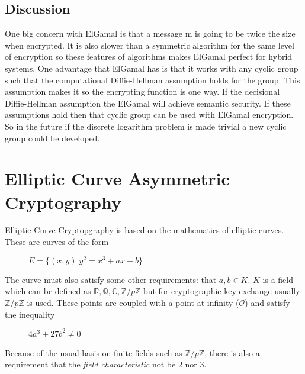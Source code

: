 \documentclass[conference]{IEEEtran}
\begin{document}
\subsection{Discussion}
One big concern with ElGamal is that a message m is going to be twice the size when encrypted. It is also slower than a symmetric algorithm for the same level of encryption so these features of algorithms makes ElGamal perfect for hybrid systems. \newline \indent
One advantage that ElGamal has is that it works with any cyclic group such that the computational Diffie-Hellman assumption holds for the group. This assumption makes it so the encrypting function is one way. If the decisional Diffie-Hellman assumption the ElGamal will achieve semantic security. If these assumptions hold then that cyclic group can be used with ElGamal encryption. So in the future if the discrete logarithm problem is made trivial a new cyclic group could be developed.


\section{Elliptic Curve Asymmetric Cryptography}
Elliptic Curve Cryptopgraphy is based on the mathematics of elliptic curves. These are curves of the form

\begin{figure}[h]
	\begin{center}
		$E = \{(x, y) | y^2 = x^3 + ax + b\}$
	\end{center}
\end{figure}

The curve must also satisfy some other requirements: that $a, b \in K$. $K$ is a field which can be defined as $\mathbb{R}, \mathbb{Q}, \mathbb{C}, \mathbb{Z}/p\mathbb{Z}$ but for cryptographic key-exchange usually $\mathbb{Z}/p\mathbb{Z}$ is used. These points are coupled with a point at infinity ($\mathcal{O}$) and satisfy the inequality

\begin{figure}[h]
	\begin{center}
		$4a^3 + 27b^2 \neq 0$
	\end{center}
\end{figure}

Because of the usual basis on finite fields such as $\mathbb{Z}/p\mathbb{Z}$, there is also a requirement that the \textit{field characteristic} not be 2 nor 3.
\end{document}
